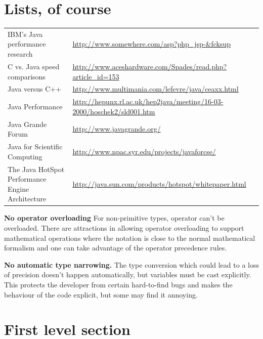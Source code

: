 \documentclass[pdftex,english,a4paper,10pt,twocolumn]{infocom}
\begin{document}
\section{Lists, of course}
\label{id2719356}\hypertarget{id2719356}{}%

\begin{tabular*}{\linewidth}{ll} 
IBM's Java performance research & 
        \href{http://www.somewhere.com/asp?php_jsp-&fcksup?}{http://www.somewhere.com/asp?php\_jsp-\&fcksup}
        \\
C vs. Java speed comparisons  & 
        \url{http://www.aceshardware.com/Spades/read.php?article_id=153}
        \\
Java versus C++ & 
        \url{http://www.multimania.com/lefevre/java/ceaxx.html}
        \\
Java Performance & 
        \url{http://hepunx.rl.ac.uk/hep2java/meeting/16-03-2000/hoschek2/sld001.htm}
        \\
 
	  Java Grande Forum & 
        \url{http://www.javagrande.org/}
        \\
 
	   Java for Scientific Computing & 
        \url{http://www.npac.syr.edu/projects/javaforcse/}
        \\
 
	  The Java HotSpot Performance Engine Architecture & 
        \url{ http://java.sun.com/products/hotspot/whitepaper.html}
        \\
\end{tabular*}

{\bf No operator overloading} 
 For non-primitive types, operator can't be overloaded.
	There are attractions in allowing operator overloading to
	support mathematical operations where the notation is close to
	the normal mathematical formalism and one can take advantage of
	the operator precedence rules.
      



{\bf No automatic type narrowing.} 
 The
	type conversion which could lead to a loss of precision
	doesn't happen automatically, but variables must be cast
	explicitly. This protects the developer from certain
	hard-to-find bugs and makes the behaviour of the code
	explicit, but some may find it annoying.




\section{First level section}
\label{id2719526}\hypertarget{id2719526}{}%
\end{document}
